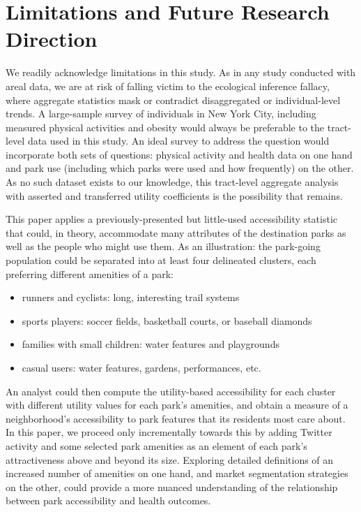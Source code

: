 \documentclass[Afour,sageh.bst]{sagej}
\begin{document}
\hypertarget{limitations-and-future-research-direction}{%
\section{Limitations and Future Research
Direction}\label{limitations-and-future-research-direction}}

We readily acknowledge limitations in this study. As in any study
conducted with areal data, we are at risk of falling victim to the
ecological inference fallacy, where aggregate statistics mask or
contradict disaggregated or individual-level trends. A large-sample
survey of individuals in New York City, including measured physical
activities and obesity would always be preferable to the tract-level
data used in this study. An ideal survey to address the question would
incorporate both sets of questions: physical activity and health data on
one hand and park use (including which parks were used and how
frequently) on the other. As no such dataset exists to our knowledge,
this tract-level aggregate analysis with asserted and transferred
utility coefficients is the possibility that remains.

This paper applies a previously-presented but little-used accessibility
statistic that could, in theory, accommodate many attributes of the
destination parks as well as the people who might use them. As an
illustration: the park-going population could be separated into at least
four delineated clusters, each preferring different amenities of a park:

\begin{itemize}
 \item{runners and cyclists: long, interesting trail systems}
 \item{sports players: soccer fields, basketball courts, or baseball diamonds}
 \item{families with small children: water features and playgrounds}
 \item{casual users: water features, gardens, performances, etc.}
\end{itemize}

An analyst could then compute the utility-based accessibility for each
cluster with different utility values for each park's amenities, and
obtain a measure of a neighborhood's accessibility to park features that
its residents most care about. In this paper, we proceed only
incrementally towards this by adding Twitter activity and some selected
park amenities as an element of each park's attractiveness above and
beyond its size. Exploring detailed definitions of an increased number
of amenities on one hand, and market segmentation strategies on the
other, could provide a more nuanced understanding of the relationship
between park accessibility and health outcomes.
\end{document}
